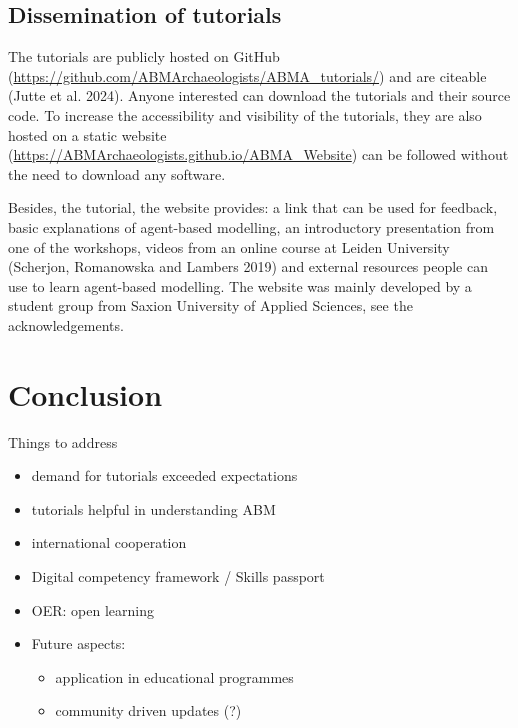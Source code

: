 \documentclass[
]{article}
\begin{document}
\hypertarget{dissemination-of-tutorials}{%
\subsection{Dissemination of tutorials}\label{dissemination-of-tutorials}}

The tutorials are publicly hosted on GitHub (\url{https://github.com/ABMArchaeologists/ABMA_tutorials/}) and are citeable (Jutte et al. 2024). Anyone interested can download the tutorials and their source code. To increase the accessibility and visibility of the tutorials, they are also hosted on a static website (\href{https://ABMArchaeologists.github.io/ABMA_Website/\#/}{https://ABMArchaeologists.github.io/ABMA\_Website}) can be followed without the need to download any software.

Besides, the tutorial, the website provides: a link that can be used for feedback, basic explanations of agent-based modelling, an introductory presentation from one of the workshops, videos from an online course at Leiden University (Scherjon, Romanowska and Lambers 2019) and external resources people can use to learn agent-based modelling. The website was mainly developed by a student group from Saxion University of Applied Sciences, see the acknowledgements.

\hypertarget{conclusion}{%
\section{Conclusion}\label{conclusion}}

Things to address

\begin{itemize}
\item
  demand for tutorials exceeded expectations
\item
  tutorials helpful in understanding ABM
\item
  international cooperation
\item
  Digital competency framework / Skills passport
\item
  OER: open learning
\item
  Future aspects:

  \begin{itemize}
  \item
    application in educational programmes
  \item
    community driven updates (?)
  \end{itemize}
\end{itemize}
\end{document}
